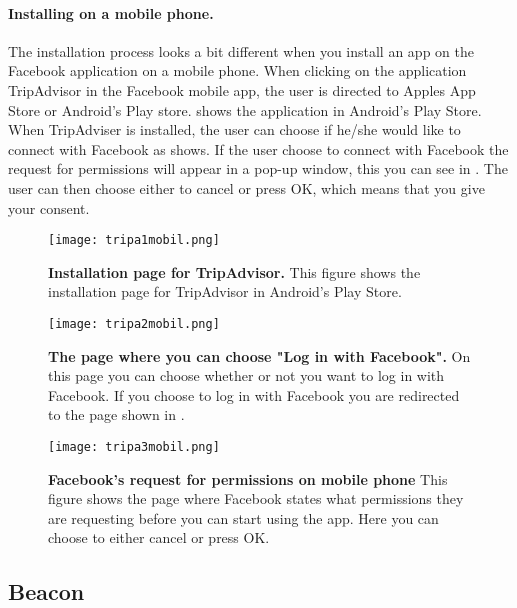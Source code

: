 \paragraph{Installing on a mobile phone.}
The installation process looks a bit different when you install an app on the Facebook application on a mobile phone. When clicking on the application TripAdvisor in the Facebook mobile app, the user is directed to Apples App Store or Android's Play store.  shows the application in Android's Play Store. When TripAdviser is installed, the user can choose if he/she would like to connect with Facebook as  shows. If the user choose to connect with Facebook the request for permissions will appear in a pop-up window, this you can see in . The user can then choose either to cancel or press OK, which means that you give your consent. 


\begin{figure}[h!]
\centering
\texttt{[image: tripa1mobil.png]}
\caption[Installation page for TripAdvisor]{\textbf{Installation page for TripAdvisor.} This figure shows the installation page for TripAdvisor in Android's Play Store.} 
\label{fig:tripa1mobil}
\end{figure}

\begin{figure}[h!]
\centering
\texttt{[image: tripa2mobil.png]}
\caption[The page where you choose "Log in with Facebook"]{\textbf{The page where you can choose "Log in with Facebook".} On this page you can choose whether or not you want to log in with Facebook. If you choose to log in with Facebook you are redirected to the page shown in .} 
\label{fig:tripa2mobil}
\end{figure}

\begin{figure}[h!]
\centering
\texttt{[image: tripa3mobil.png]}
\caption[Facebook's request for permissions on mobile phone]{\textbf{Facebook's request for permissions on mobile phone} This figure shows the page where Facebook states what permissions they are requesting before you can start using the app. Here you can choose to either cancel or press OK.} 
\label{fig:tripa3mobil}
\end{figure}



\subsection{Beacon}
